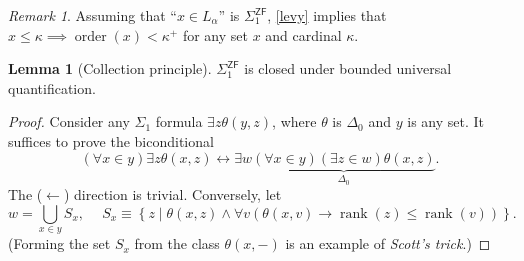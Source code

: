 \documentclass[10pt,letterpaper,cm]{nupset}
\theoremstyle{definition}
\theoremstyle{theorem}
\newtheorem{lemma}[definition]{Lemma}
\theoremstyle{remark}
\newtheorem{remark}[definition]{Remark}
\newcommand{\1}{\mathbf{1}}
\newcommand{\0}{\vec 0}
\newcommand{\zf}{\mathsf{ZF}}
\DeclareMathOperator{\order}{order}
\DeclareMathOperator{\rnk}{rank}
\begin{document}
\begin{remark}
Assuming that ``$x\in L_{\alpha}$'' is $\Sigma_1^{\zf}$, \cref{levy} implies that $x\leq \kappa \implies \order(x) < \kappa^{+}$ for any set $x$ and cardinal $\kappa$.
\end{remark}

\begin{lemma}[Collection principle]\label{S1closed}
$\Sigma_1^{\zf}$ is closed under bounded universal quantification.
\end{lemma}
\begin{proof}
Consider any $\Sigma_1$ formula $\exists{z}{\theta(y,z)}$, where $\theta$ is $\Delta_0$ and $y$ is any set. It suffices to prove the biconditional 
\[
\left(\forall{x\in y}\right)\exists{z}{\theta(x,z)} \leftrightarrow \exists{w}\underbrace{\left(\forall{x \in y}\right)\left(\exists{z\in w}\right){\theta(x,z)}}_{\Delta_0}
.\] The ($\leftarrow$) direction is trivial. Conversely, let 
\[
w = \bigcup_{x\in y}S_x, \ \quad S_x \equiv \left\{z \mid \theta(x,z) \land \forall{v}\left(\theta(x,v) \to \rnk(z) \leq \rnk(v)\right)\right\}
.\] (Forming the set $S_x$ from the class $\theta(x, {-})$ is an example of \textit{Scott's trick}.)
\end{proof}

\smallskip
\end{document}
